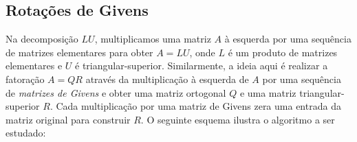 \documentclass{article}
\begin{document}
\subsection{Rotações de Givens}

Na decomposição \(LU\), multiplicamos uma matriz \(A\) à esquerda por uma sequência de matrizes elementares para obter \(A=LU\), onde \(L\) é um produto de matrizes elementares e \(U\) é triangular-superior. Similarmente, a ideia aqui é realizar a fatoração \(A=QR\) através da multiplicação à esquerda de \(A\) por uma sequência de \emph{matrizes de Givens} e obter uma matriz ortogonal \(Q\) e uma matriz triangular-superior \(R\). Cada multiplicação por uma matriz de Givens zera uma entrada da matriz original para construir \(R\). O seguinte esquema ilustra o algoritmo a ser estudado: 
\end{document}
